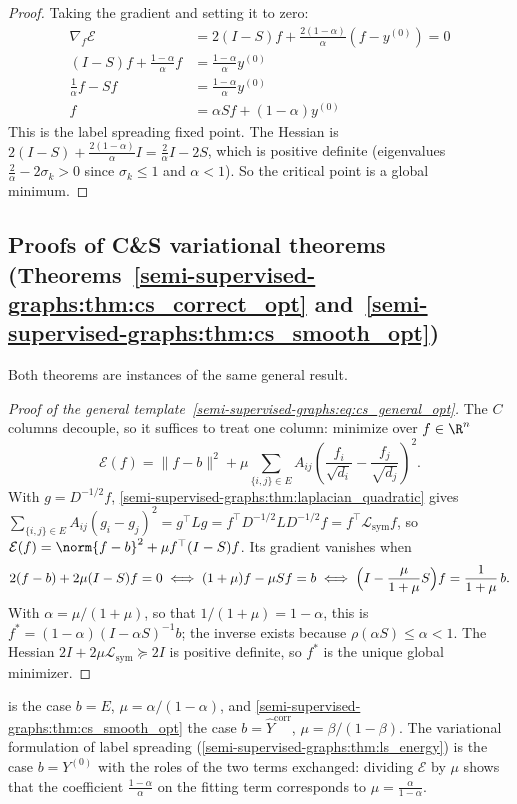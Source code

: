 \begin{notechapter}
\begin{proof}
Taking the gradient and setting it to zero:
\begin{align}
\nabla_f \mathcal{E} &= 2(I - S)f + \frac{2(1-\alpha)}{\alpha}(f - y^{(0)}) = 0\\
(I - S)f + \frac{1-\alpha}{\alpha}f &= \frac{1-\alpha}{\alpha}y^{(0)} \\
\frac{1}{\alpha}f - Sf &= \frac{1-\alpha}{\alpha}y^{(0)} \\
f &= \alpha Sf + (1-\alpha)y^{(0)}
\end{align}
This is the label spreading fixed point. The Hessian is
$2(I - S) + \frac{2(1-\alpha)}{\alpha}I = \frac{2}{\alpha}I - 2S$, which is
positive definite (eigenvalues $\frac{2}{\alpha} - 2\sigma_k > 0$ since
$\sigma_k \leq 1$ and $\alpha < 1$). So the critical point is a global minimum.
\end{proof}

\subsection{Proofs of C\&S variational theorems
  (Theorems~\ref{semi-supervised-graphs:thm:cs_correct_opt} and~\ref{semi-supervised-graphs:thm:cs_smooth_opt})}
\label{semi-supervised-graphs:app:cs_opt}

Both theorems are instances of the same general result.

\begin{proof}[Proof of the general template~\eqref{semi-supervised-graphs:eq:cs_general_opt}]
The $C$ columns decouple, so it suffices to treat one column: minimize over $f \in \R^n$
\[
  \mathcal{E}(f) = \|f - b\|^2 + \mu\sum_{\{i,j\}\in E}A_{ij}
  \left(\frac{f_i}{\sqrt{d_i}} - \frac{f_j}{\sqrt{d_j}}\right)^2 .
\]
With $g = D^{-1/2}f$, \cref{semi-supervised-graphs:thm:laplacian_quadratic} gives $\sum_{\{i,j\}\in E}A_{ij}(g_i - g_j)^2 = g^\top Lg = f^\top D^{-1/2}LD^{-1/2}f = f^\top\mathcal L_{\mathrm{sym}}f$, so $\mathcal E(f) = \norm{f - b}^2 + \mu f^\top(I - S)f$. Its gradient vanishes when
\[
2(f - b) + 2\mu(I - S)f = 0 \iff (1+\mu)f - \mu Sf = b \iff \Bigl(I - \frac{\mu}{1+\mu}S\Bigr)f = \frac{1}{1+\mu}\,b .
\]
With $\alpha = \mu/(1+\mu)$, so that $1/(1+\mu) = 1-\alpha$, this is $f^* = (1-\alpha)(I - \alpha S)^{-1}b$; the inverse exists because $\rho(\alpha S) \le \alpha < 1$. The Hessian $2I + 2\mu\mathcal L_{\mathrm{sym}} \succeq 2I$ is positive definite, so $f^*$ is the unique global minimizer.
\end{proof}

 is the case $b = E$, $\mu = \alpha/(1-\alpha)$, and \cref{semi-supervised-graphs:thm:cs_smooth_opt} the case $b = \hat Y^{\text{corr}}$, $\mu = \beta/(1-\beta)$. The variational formulation of label spreading (\cref{semi-supervised-graphs:thm:ls_energy}) is the case $b = Y^{(0)}$ with the roles of the two terms exchanged: dividing $\mathcal E$ by $\mu$ shows that the coefficient $\frac{1-\alpha}{\alpha}$ on the fitting term corresponds to $\mu = \frac{\alpha}{1-\alpha}$.


\end{notechapter}
